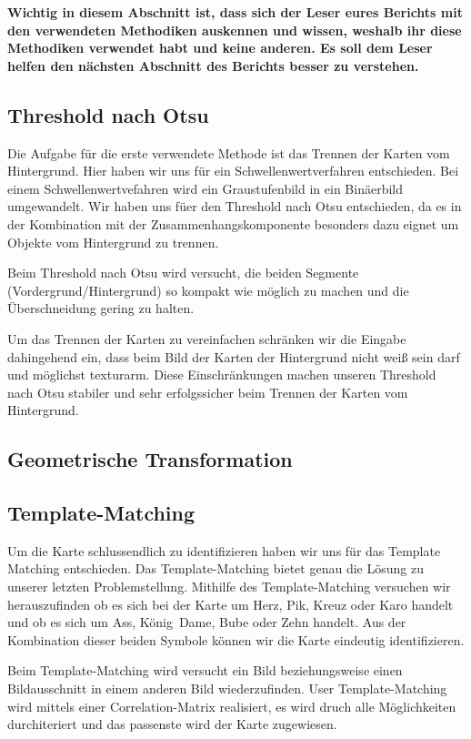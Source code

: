 \documentclass[paper=A4, deutsch]{scrartcl}
\begin{document}
\textbf{Wichtig in diesem Abschnitt ist, dass sich der Leser eures Berichts mit den verwendeten Methodiken auskennen und wissen, weshalb ihr diese Methodiken verwendet habt und keine anderen. Es soll dem Leser helfen den nächsten Abschnitt des Berichts besser zu verstehen.}
\subsection{Threshold nach Otsu}
Die Aufgabe für die erste verwendete Methode ist das Trennen der Karten vom Hintergrund. Hier haben wir uns für ein Schwellenwertverfahren entschieden. Bei einem Schwellenwertvefahren wird
ein Graustufenbild in ein Bin\"aerbild umgewandelt. Wir haben uns f\"uer den Threshold nach Otsu entschieden, da es in der Kombination mit der Zusammenhangskomponente besonders dazu eignet 
um Objekte vom Hintergrund zu trennen. 

Beim Threshold nach Otsu wird versucht, die beiden Segmente (Vordergrund/Hintergrund) so kompakt wie möglich zu machen und die Überschneidung gering zu halten.

Um das Trennen der Karten zu vereinfachen schränken wir die Eingabe dahingehend ein, dass beim Bild der Karten der Hintergrund nicht weiß sein darf und möglichst texturarm. Diese 
Einschränkungen machen unseren Threshold nach Otsu stabiler und sehr erfolgssicher beim Trennen der Karten vom Hintergrund.
\subsection{Geometrische Transformation}

\subsection{Template-Matching}
Um die Karte schlussendlich zu identifizieren haben wir uns für das Template Matching entschieden. Das Template-Matching bietet genau die Lösung zu unserer letzten Problemstellung.
Mithilfe des Template-Matching versuchen wir herauszufinden ob es sich bei der Karte um Herz, Pik, Kreuz oder Karo handelt und ob es sich um Ass, K\"onig\, Dame, Bube oder Zehn handelt.
Aus der Kombination dieser beiden Symbole k\"onnen wir die Karte eindeutig identifizieren.

Beim Template-Matching wird versucht ein Bild beziehungsweise einen Bildausschnitt in einem anderen Bild wiederzufinden. User Template-Matching wird mittels einer Correlation-Matrix realisiert,
es wird druch alle Möglichkeiten durchiteriert und das passenste wird der Karte zugewiesen.
\end{document}

